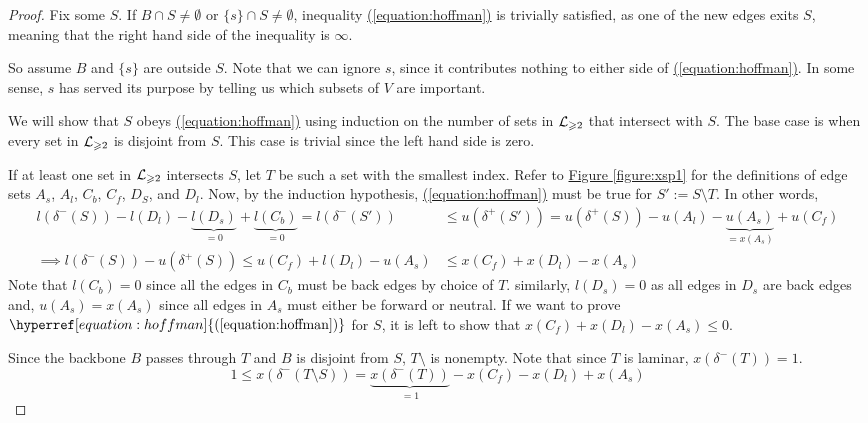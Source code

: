 \documentclass[./main.tex]{subfiles}
\begin{document}
\begin{proof}
			Fix some $S$. If $B\cap S\neq \emptyset$ or $\{s\}\cap S\neq \emptyset$, inequality \hyperref[equation:hoffman]{(\ref{equation:hoffman})} is trivially satisfied, as one of the new edges exits $S$, meaning that the right hand side of the inequality is $\infty$.

			So assume $B$ and $\{s\}$ are outside $S$. Note that we can ignore $s$, since it contributes nothing to either side of \hyperref[equation:hoffman]{(\ref{equation:hoffman})}. In some sense, $s$ has served its purpose by telling us which subsets of $V$ are important.

			We will show that $S$ obeys \hyperref[equation:hoffman]{(\ref{equation:hoffman})} using induction on the number of sets in $\mathcal{L}_{\geqslant 2}$ that intersect with $S$. The base case is when every set in $\mathcal{L}_{\geqslant 2}$ is disjoint from $S$. This case is trivial since the left hand side is zero.

			If at least one set in $\mathcal{L}_{\geqslant 2}$ intersects $S$, let $T$ be such a set with the smallest index. Refer to \hyperref[figure:xsp1]{Figure \ref{figure:xsp1}} for the definitions of edge sets $A_s$, $A_l$, $C_b$, $C_f$, $D_S$, and $D_l$.
			Now, by the induction hypothesis, \hyperref[equation:hoffman]{(\ref{equation:hoffman})} must be true for $S':=S\setminus T$. In other words,
			\begin{align}
				l(\delta^-(S)) - l(D_l) - \underbrace{l(D_s)}_{=0} + \underbrace{l(C_b)}_{=0} = l(\delta^-(S')) &\leqslant u(\delta^+(S')) = u(\delta^+(S)) - u(A_l) - \underbrace{u(A_s)}_{= x(A_s)} + u(C_f)\nonumber\\
				\implies l(\delta^-(S)) - u(\delta^+(S)) \leqslant u(C_f) + l(D_l) - u(A_s) &\leqslant x(C_f) + x(D_l) - x(A_s) \label{P6:eqn:altproof}
			\end{align}
			Note that $l(C_b) = 0$ since all the edges in $C_b$ must be back edges by choice of $T$. similarly, $l(D_s) = 0$ as all edges in $D_s$ are back edges and, $u(A_s) = x(A_s)$ since all edges in $A_s$ must either be forward or neutral.
			If we want to prove $\hyperref[equation:hoffman]{(\ref{equation:hoffman})}$ for $S$, it is left to show that $x(C_f) + x(D_l) - x(A_s) \leqslant 0$.

			Since the backbone $B$ passes through $T$ and $B$ is disjoint from $S$, $T\setminus$ is nonempty. Note that since $T$ is laminar, $x(\delta^-(T)) = 1$.
			\[
				1\leq x(\delta^-(T\setminus S))=\underbrace{x(\delta^-(T))}_{=1} - x(C_f) - x(D_l) + x(A_s)
			\]


\end{proof}
\end{document}
